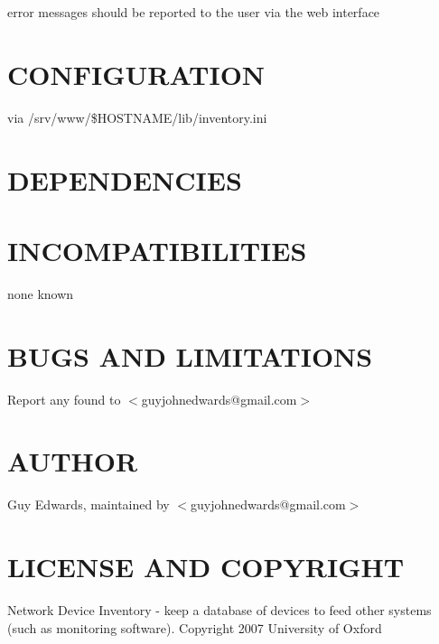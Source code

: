 \documentclass{book}
\begin{document}
error messages should be reported to the user via the web interface


\section{CONFIGURATION}
\label{_CONFIGURATION}
\hypertarget{_CONFIGURATION}{}



via /srv/www/\$HOSTNAME/lib/inventory.ini


\section{DEPENDENCIES}
\label{_DEPENDENCIES}
\hypertarget{_DEPENDENCIES}{}


\section{INCOMPATIBILITIES}
\label{_INCOMPATIBILITIES}
\hypertarget{_INCOMPATIBILITIES}{}



none known


\section{BUGS AND LIMITATIONS}
\label{_BUGS_AND_LIMITATIONS}
\hypertarget{_BUGS_AND_LIMITATIONS}{}



Report any found to $<$guyjohnedwards@gmail.com$>$


\section{AUTHOR}
\label{_AUTHOR}
\hypertarget{_AUTHOR}{}



Guy Edwards, maintained by $<$guyjohnedwards@gmail.com$>$


\section{LICENSE AND COPYRIGHT}
\label{_LICENSE_AND_COPYRIGHT}
\hypertarget{_LICENSE_AND_COPYRIGHT}{}



Network Device Inventory - keep a database of devices to feed other systems (such as monitoring software). Copyright 2007 University of Oxford
\end{document}
